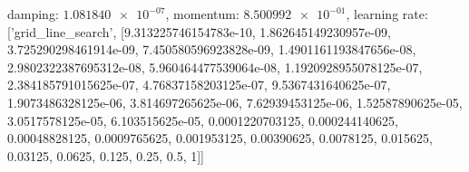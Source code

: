 damping: $\num[scientific-notation=true]{1.081840e-07}$, momentum: $\num[scientific-notation=true]{8.500992e-01}$, learning rate: ['grid_line_search', [9.313225746154783e-10, 1.862645149230957e-09, 3.725290298461914e-09, 7.450580596923828e-09, 1.4901161193847656e-08, 2.9802322387695312e-08, 5.960464477539064e-08, 1.1920928955078125e-07, 2.384185791015625e-07, 4.76837158203125e-07, 9.5367431640625e-07, 1.9073486328125e-06, 3.814697265625e-06, 7.62939453125e-06, 1.52587890625e-05, 3.0517578125e-05, 6.103515625e-05, 0.0001220703125, 0.000244140625, 0.00048828125, 0.0009765625, 0.001953125, 0.00390625, 0.0078125, 0.015625, 0.03125, 0.0625, 0.125, 0.25, 0.5, 1]]